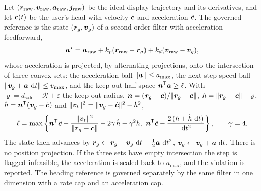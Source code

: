 \begin{model}
\label{mod:governor}
Let $(\bm{r}_{\mathrm{raw}},\bm{v}_{\mathrm{raw}},\bm{a}_{\mathrm{raw}},
\bm{j}_{\mathrm{raw}})$ be the ideal display trajectory and its derivatives,
and let $\bm{c}(t)$ be the user's head with velocity $\dot{\bm{c}}$ and
acceleration $\ddot{\bm{c}}$. The governed reference is the state
$(\bm{r}_g,\bm{v}_g)$ of a second-order filter with acceleration feedforward,
\begin{equation}
  \bm{a}^{\star} = \bm{a}_{\mathrm{raw}}
    + k_p(\bm{r}_{\mathrm{raw}}-\bm{r}_g)
    + k_d(\bm{v}_{\mathrm{raw}}-\bm{v}_g) ,
  \label{eq:gov1}
\end{equation}
whose acceleration is projected, by alternating projections, onto the
intersection of three convex sets: the acceleration ball
$\|\bm{a}\|\le a_{\max}$, the next-step speed ball
$\|\bm{v}_g+\bm{a}\,\,\mathrm{d} t\|\le v_{\max}$, and the keep-out half-space
$\bm{n}^{\mathsf{T}}\bm{a}\ge\ell$. With
$\varrho = d_{\mathrm{safe}}+\mathcal{R}+\varepsilon$ the keep-out radius,
$\bm{n} = (\bm{r}_g-\bm{c})/\|\bm{r}_g-\bm{c}\|$,
$h = \|\bm{r}_g-\bm{c}\|-\varrho$, $\dot{h} = \bm{n}^{\mathsf{T}}(\bm{v}_g-\dot{\bm{c}})$
and $\|\bm{v}_t\|^2 = \|\bm{v}_g-\dot{\bm{c}}\|^2-\dot{h}^2$,
\begin{equation}
  \ell = \max\left\{
    \bm{n}^{\mathsf{T}}\ddot{\bm{c}} - \frac{\|\bm{v}_t\|^2}{\|\bm{r}_g-\bm{c}\|}
      - 2\gamma\,\dot{h} - \gamma^2 h ,\;
    \bm{n}^{\mathsf{T}}\ddot{\bm{c}} - \frac{2\,(h + \dot{h}\,\,\mathrm{d} t)}{\,\mathrm{d} t^{2}}
  \right\},
  \qquad \gamma = 4 .
  \label{eq:barrier}
\end{equation}
The state then advances by
$\bm{r}_g\leftarrow\bm{r}_g+\bm{v}_g\,\,\mathrm{d} t+\tfrac12\bm{a}\,\,\mathrm{d} t^2$,
$\bm{v}_g\leftarrow\bm{v}_g+\bm{a}\,\,\mathrm{d} t$. There is no position projection.
If the three sets have empty intersection the step is flagged infeasible, the
acceleration is scaled back to $a_{\max}$, and the violation is reported. The
heading reference is governed separately by the same filter in one dimension
with a rate cap and an acceleration cap.
\end{model}

